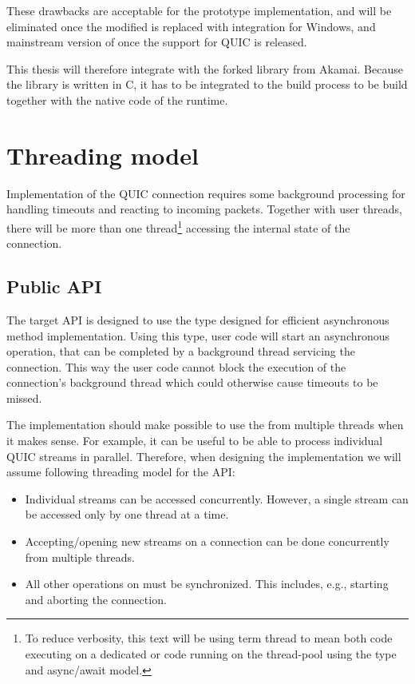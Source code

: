 These drawbacks are acceptable for the prototype implementation, and will be eliminated once the
modified \libopenssl{} is replaced with \libschannel{} integration for Windows, and mainstream
version of \libopenssl{} once the support for QUIC is released.

This thesis will therefore integrate with the forked \libopenssl{} library from Akamai. Because the
library is written in C, it has to be integrated to the build process to be build together with the
native code of the \dotnet{} runtime.

\section{Threading model}

Implementation of the QUIC connection requires some background processing for handling timeouts and
reacting to incoming packets. Together with user threads, there will be more than one
thread\footnote{To reduce verbosity, this text will be using term thread to mean both code executing on a
  dedicated  or code running on the thread-pool using the  type and
  \dotnet{} async/await model.} accessing the internal state of the connection.

\subsection{Public API}

The target API is designed to use the  type designed for efficient asynchronous
method implementation. Using this type, user code will start an asynchronous operation, that can be
completed by a background thread servicing the connection. This way the user code cannot block the
execution of the connection's background thread which could otherwise cause timeouts to be missed.

The implementation should make possible to use the \QuicConnection{} from multiple threads when
it makes sense. For example, it can be useful to be able to process individual QUIC streams in
parallel. Therefore, when designing the implementation we will assume following threading model for
the API:

\begin{itemize}

  \item Individual streams can be accessed concurrently. However, a single stream can be
    accessed only by one thread at a time.

  \item Accepting/opening new streams on a connection can be done concurrently from multiple threads.

  \item All other operations on \QuicConnection{} must be synchronized. This includes, e.g.,
    starting and aborting the connection.

\end{itemize}

